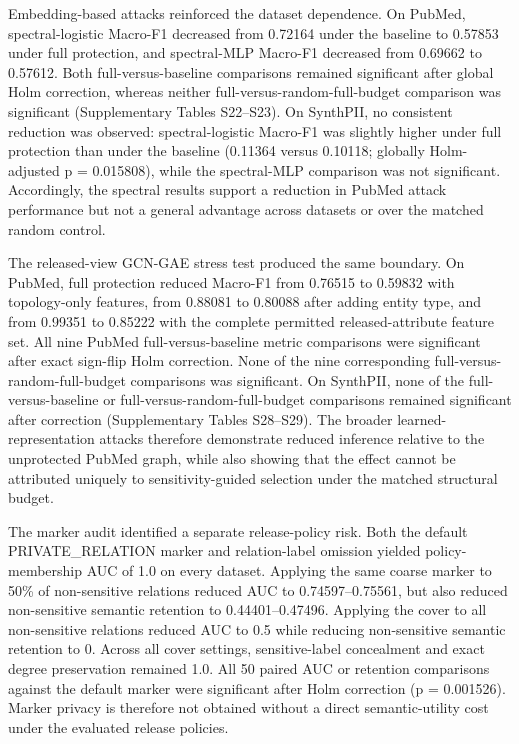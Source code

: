\documentclass[preprint,12pt]{elsarticle}
\begin{document}
Embedding-based attacks reinforced the dataset dependence. On PubMed, spectral-logistic Macro-F1 decreased from 0.72164 under the baseline to 0.57853 under full protection, and spectral-MLP Macro-F1 decreased from 0.69662 to 0.57612. Both full-versus-baseline comparisons remained significant after global Holm correction, whereas neither full-versus-random-full-budget comparison was significant (Supplementary Tables S22--S23). On SynthPII, no consistent reduction was observed: spectral-logistic Macro-F1 was slightly higher under full protection than under the baseline (0.11364 versus 0.10118; globally Holm-adjusted p = 0.015808), while the spectral-MLP comparison was not significant. Accordingly, the spectral results support a reduction in PubMed attack performance but not a general advantage across datasets or over the matched random control.

The released-view GCN-GAE stress test produced the same boundary. On PubMed, full protection reduced Macro-F1 from 0.76515 to 0.59832 with topology-only features, from 0.88081 to 0.80088 after adding entity type, and from 0.99351 to 0.85222 with the complete permitted released-attribute feature set. All nine PubMed full-versus-baseline metric comparisons were significant after exact sign-flip Holm correction. None of the nine corresponding full-versus-random-full-budget comparisons was significant. On SynthPII, none of the full-versus-baseline or full-versus-random-full-budget comparisons remained significant after correction (Supplementary Tables S28--S29). The broader learned-representation attacks therefore demonstrate reduced inference relative to the unprotected PubMed graph, while also showing that the effect cannot be attributed uniquely to sensitivity-guided selection under the matched structural budget.

The marker audit identified a separate release-policy risk. Both the default PRIVATE\_RELATION marker and relation-label omission yielded policy-membership AUC of 1.0 on every dataset. Applying the same coarse marker to 50\% of non-sensitive relations reduced AUC to 0.74597--0.75561, but also reduced non-sensitive semantic retention to 0.44401--0.47496. Applying the cover to all non-sensitive relations reduced AUC to 0.5 while reducing non-sensitive semantic retention to 0. Across all cover settings, sensitive-label concealment and exact degree preservation remained 1.0. All 50 paired AUC or retention comparisons against the default marker were significant after Holm correction (p = 0.001526). Marker privacy is therefore not obtained without a direct semantic-utility cost under the evaluated release policies.
\end{document}
